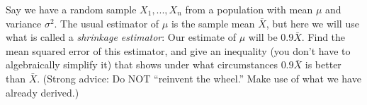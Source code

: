 \oneproblem
Say we have a random sample $X_1,...,X_n$ from a population
with mean $\mu$ and variance $\sigma^2$.  The usual estimator of $\mu$
is the sample mean $\bar{X}$, but here we will use what is called a {\it
shrinkage estimator}:  Our estimate of $\mu$ will be $0.9 \bar{X}$.
Find the mean squared error of this estimator, and give an inequality
(you don't have to algebraically simplify it) that shows under what
circumstances $0.9 \bar{X}$ is better than $\bar{X}$.  (Strong advice:
Do NOT ``reinvent the wheel.''  Make use of what we have already
derived.)


